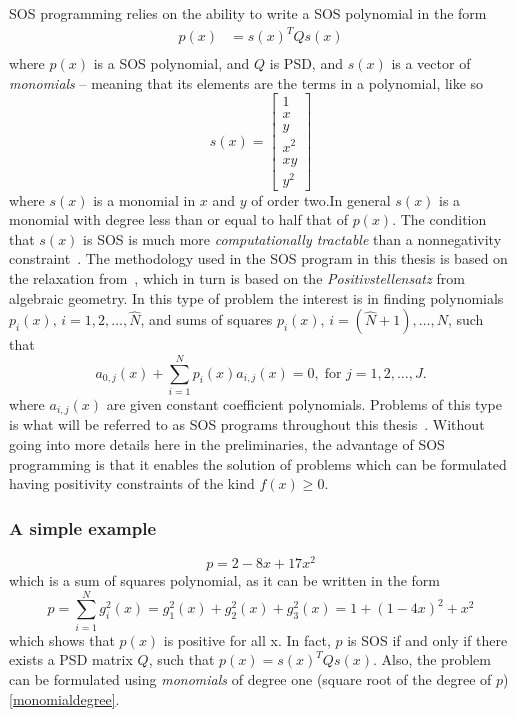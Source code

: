 \ac{SOS} programming relies on the ability to write a SOS polynomial in the form
\begin{align*}
  p(x) &= s{(x)}^{T}Qs(x)\\
\end{align*}
where \(p(x)\) is a \ac{SOS} polynomial, and \(Q\) is \ac{PSD}, and \(s(x)\) is
a vector of \textit{monomials} -- meaning that its elements are the terms in a
polynomial, like so
\[
  s(x) = \begin{bmatrix} 1 \\ x \\ y \\ x^2 \\ xy \\ y^2 \end{bmatrix}
\]
where \(s(x)\) is a monomial in \(x\) and \(y\) of order two.In general \(s(x)\)
is a monomial with degree less than or equal to half that of
\(p(x)\)\cite{parilloStructuredSemidefinitePrograms}\label{monomialdegree}. The
condition that \(s(x)\) is \ac{SOS} is much more \textit{computationally
  tractable} than a nonnegativity
constraint~\cite{parilloStructuredSemidefinitePrograms}. The methodology used in
the \ac{SOS} program in this thesis is based on the relaxation
from~\cite{parilloStructuredSemidefinitePrograms}, which in turn is based on the
\textit{Positivstellensatz} from algebraic geometry. In this type of problem the
interest is in finding polynomials \(p_i(x), \, i=1,2,\ldots,\hat{N}\), and sums
of squares \(p_i(x), \, i=(\hat{N}+1),\ldots,N\), such that
\[
  a_{0,j}(x) + \sum_{i=1}^{N}p_{i}(x)a_{i,j}(x) = 0, \; \text{for } j =
  1,2,\ldots,J.
\]
where \(a_{i,j}(x)\) are given constant coefficient polynomials. Problems of
this type is what will be referred to as \ac{SOS} programs throughout this
thesis~\cite{sostools}. Without going into more details here in the
preliminaries, the advantage of \ac{SOS} programming is that it enables the
solution of problems which can be formulated having positivity constraints of
the kind \(f(x) \geq 0\).

\subsubsection{A simple example}

\[
  p = 2 - 8x + 17x^2
\]
which is a sum of squares polynomial, as it can be written in the form
\[
  p = \sum_{i=1}^{N}g_i^2(x) = g_1^2(x) + g_2^2(x) + g_3^2(x)= 1 + {(1-4x)}^2 +
  x^2
\]
which shows that \(p(x)\) is positive for all x. In fact, \(p\) is \ac{SOS} if
and only if there exists a \acl{PSD} matrix \(Q\), such that \(p(x) =
s{(x)}^{T}Qs(x)\). Also, the problem can be formulated using \textit{monomials}
of degree one (square root of the degree of \(p\))\ref{monomialdegree}.

